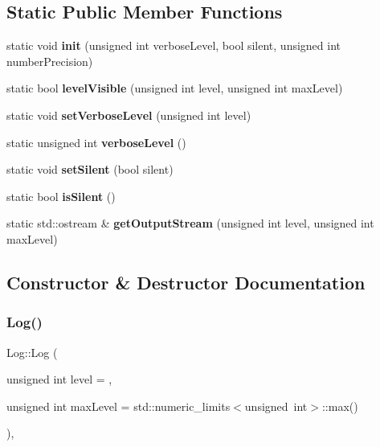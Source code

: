 \subsection*{Static Public Member Functions}
\begin{DoxyCompactItemize}
\item 
\mbox{\label{classLog_aac405fad2fd60f79712a8ba6ac3e17ec}} 
static void {\bfseries init} (unsigned int verbose\+Level, bool silent, unsigned int number\+Precision)
\item 
\mbox{\label{classLog_a16795109bbdc04ceee5bf1cbd7182082}} 
static bool {\bfseries level\+Visible} (unsigned int level, unsigned int max\+Level)
\item 
\mbox{\label{classLog_a1df36a4339129f7749a8747f9019b1d0}} 
static void {\bfseries set\+Verbose\+Level} (unsigned int level)
\item 
\mbox{\label{classLog_adf1921351f918e112f3664cd1c9083d8}} 
static unsigned int {\bfseries verbose\+Level} ()
\item 
\mbox{\label{classLog_a5764f55139faa7c6ad2979a52d2b75b7}} 
static void {\bfseries set\+Silent} (bool silent)
\item 
\mbox{\label{classLog_a84f81df9776cad96096dda111fec27fa}} 
static bool {\bfseries is\+Silent} ()
\item 
\mbox{\label{classLog_a9784281a7ab1cb49ce7400116c2174d0}} 
static std\+::ostream \& {\bfseries get\+Output\+Stream} (unsigned int level, unsigned int max\+Level)
\end{DoxyCompactItemize}


\subsection{Constructor \& Destructor Documentation}
\mbox{\label{classLog_a56dcaa4d61eeb8f1944e2332c6b98572}} 
\subsubsection{\texorpdfstring{Log()}{Log()}}
{\footnotesize\ttfamily Log\+::\+Log (\begin{DoxyParamCaption}\item[{unsigned int}]{level = {},  }\item[{unsigned int}]{max\+Level = {\ttfamily std\+:\+:numeric\+\_\+limits$<$unsigned~int$>$\+:\+:max()} }\end{DoxyParamCaption})\hspace{0.3cm}{\ttfamily [inline]}, {\ttfamily [explicit]}}

